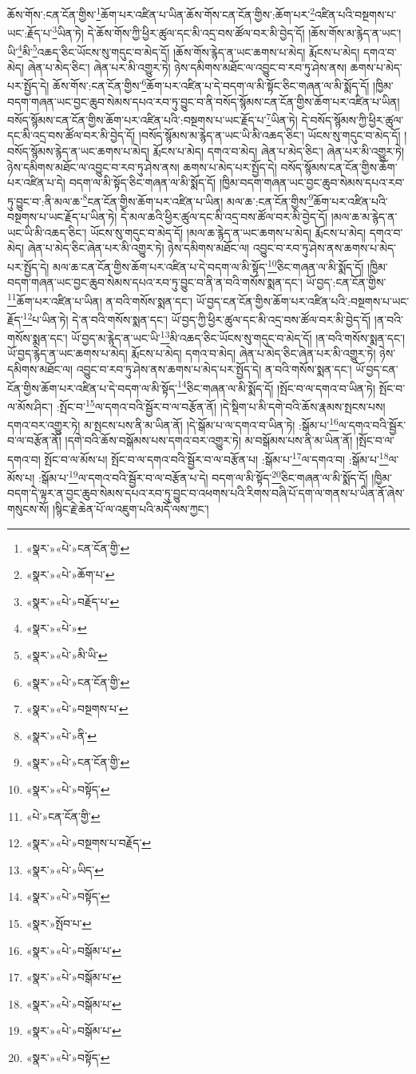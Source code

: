 ཆོས་གོས་:ངན་ངོན་གྱིས་\footnote{«སྣར་»«པེ་»ངན་ངོན་གྱི་}ཆོག་པར་འཛིན་པ་ཡིན་ཆོས་གོས་ངན་ངོན་གྱིས་:ཆོག་པར་\footnote{«སྣར་»«པེ་»ཆོག་པ་}འཛིན་པའི་བསྔགས་པ་ཡང་:རྗོད་པ་\footnote{«སྣར་»«པེ་»བརྗོད་པ་}ཡིན་ཏེ། དེ་ཆོས་གོས་ཀྱི་ཕྱིར་ཚུལ་དང་མི་འདྲ་བས་ཚོལ་བར་མི་བྱེད་དོ། །ཆོས་གོས་མ་རྙེད་ན་ཡང་། ཡི་\footnote{«སྣར་»«པེ་»}མི་\footnote{«སྣར་»«པེ་»མི་ཡི་}འཆད་ཅིང་ཡོངས་སུ་གདུང་བ་མེད་དོ། །ཆོས་གོས་རྙེད་ན་ཡང་ཆགས་པ་མེད། རྨོངས་པ་མེད། དགའ་བ་མེད། ཞེན་པ་མེད་ཅིང་། ཞེན་པར་མི་འགྱུར་ཏེ། ཉེས་དམིགས་མཐོང་ལ་འབྱུང་བ་རབ་ཏུ་ཤེས་ནས། ཆགས་པ་མེད་པར་སྤྱོད་དེ། ཆོས་གོས་:ངན་ངོན་གྱིས་\footnote{«སྣར་»«པེ་»ངན་ངོན་གྱི་}ཆོག་པར་འཛིན་པ་དེ་བདག་ལ་མི་སྟོང་ཅིང་གཞན་ལ་མི་སྨོད་དོ། །ཁྱིམ་བདག་གཞན་ཡང་བྱང་ཆུབ་སེམས་དཔའ་རབ་ཏུ་བྱུང་བ་ནི་བསོད་སྙོམས་ངན་ངོན་གྱིས་ཆོག་པར་འཛིན་པ་ཡིན། བསོད་སྙོམས་ངན་ངོན་གྱིས་ཆོག་པར་འཛིན་པའི་:བསྔགས་པ་ཡང་རྗོད་པ་\footnote{«སྣར་»«པེ་»བསྔགས་པ་}ཡིན་ཏེ། དེ་བསོད་སྙོམས་ཀྱི་ཕྱིར་ཚུལ་དང་མི་འདྲ་བས་ཚོལ་བར་མི་བྱེད་དོ། །བསོད་སྙོམས་མ་རྙེད་ན་ཡང་ཡི་མི་འཆད་ཅིང་། ཡོངས་སུ་གདུང་བ་མེད་དོ། །བསོད་སྙོམས་རྙེད་ན་ཡང་ཆགས་པ་མེད། རྨོངས་པ་མེད། དགའ་བ་མེད། ཞེན་པ་མེད་ཅིང་། ཞེན་པར་མི་འགྱུར་ཏེ། ཉེས་དམིགས་མཐོང་ལ་འབྱུང་བ་རབ་ཏུ་ཤེས་ནས། ཆགས་པ་མེད་པར་སྤྱོད་དེ། བསོད་སྙོམས་ངན་ངོན་གྱིས་ཆོག་པར་འཛིན་པ་དེ། བདག་ལ་མི་སྟོད་ཅིང་གཞན་ལ་མི་སྨོད་དོ། །ཁྱིམ་བདག་གཞན་ཡང་བྱང་ཆུབ་སེམས་དཔའ་རབ་ཏུ་བྱུང་བ་:ནི་མལ་ཆ་\footnote{«སྣར་»«པེ་»ནི་}ངན་ངོན་གྱིས་ཆོག་པར་འཛིན་པ་ཡིན། མལ་ཆ་:ངན་ངོན་གྱིས་\footnote{«སྣར་»«པེ་»ངན་ངོན་གྱི་}ཆོག་པར་འཛིན་པའི་བསྔགས་པ་ཡང་རྗོད་པ་ཡིན་ཏེ། དེ་མལ་ཆའི་ཕྱིར་ཚུལ་དང་མི་འདྲ་བས་ཚོལ་བར་མི་བྱེད་དོ། །མལ་ཆ་མ་རྙེད་ན་ཡང་ཡི་མི་འཆད་ཅིང་། ཡོངས་སུ་གདུང་བ་མེད་དོ། །མལ་ཆ་རྙེད་ན་ཡང་ཆགས་པ་མེད། རྨོངས་པ་མེད། དགའ་བ་མེད། ཞེན་པ་མེད་ཅིང་ཞེན་པར་མི་འགྱུར་ཏེ། ཉེས་དམིགས་མཐོང་ལ། འབྱུང་བ་རབ་ཏུ་ཤེས་ནས་ཆགས་པ་མེད་པར་སྤྱོད་དེ། མལ་ཆ་ངན་ངོན་གྱིས་ཆོག་པར་འཛིན་པ་དེ་བདག་ལ་མི་སྟོད་\footnote{«སྣར་»«པེ་»བསྟོད་}ཅིང་གཞན་ལ་མི་སྨོད་དོ། །ཁྱིམ་བདག་གཞན་ཡང་བྱང་ཆུབ་སེམས་དཔའ་རབ་ཏུ་བྱུང་བ་ནི་ན་བའི་གསོས་སྨན་དང་། ཡོ་བྱད་:ངན་ངོན་གྱིས་\footnote{«པེ་»ངན་ངོན་གྱི་}ཆོག་པར་འཛིན་པ་ཡིན། ན་བའི་གསོས་སྨན་དང་། ཡོ་བྱད་ངན་ངོན་གྱིས་ཆོག་པར་འཛིན་པའི་:བསྔགས་པ་ཡང་རྗོད་\footnote{«སྣར་»«པེ་»བསྔགས་པ་བརྗོད་}པ་ཡིན་ཏེ། དེ་ན་བའི་གསོས་སྨན་དང་། ཡོ་བྱད་ཀྱི་ཕྱིར་ཚུལ་དང་མི་འདྲ་བས་ཚོལ་བར་མི་བྱེད་དོ། །ན་བའི་གསོས་སྨན་དང་། ཡོ་བྱད་མ་རྙེད་ན་ཡང་ཡི་\footnote{«སྣར་»«པེ་»ཡིད་}མི་འཆད་ཅིང་ཡོངས་སུ་གདུང་བ་མེད་དོ། །ན་བའི་གསོས་སྨན་དང་། ཡོ་བྱད་རྙེད་ན་ཡང་ཆགས་པ་མེད། རྨོངས་པ་མེད། དགའ་བ་མེད། ཞེན་པ་མེད་ཅིང་ཞེན་པར་མི་འགྱུར་ཏེ། ཉེས་དམིགས་མཐོང་ལ། འབྱུང་བ་རབ་ཏུ་ཤེས་ནས་ཆགས་པ་མེད་པར་སྤྱོད་དེ། ན་བའི་གསོས་སྨན་དང་། ཡོ་བྱད་ངན་ངོན་གྱིས་ཆོག་པར་འཛིན་པ་དེ་བདག་ལ་མི་སྟོད་\footnote{«སྣར་»«པེ་»བསྟོད་}ཅིང་གཞན་ལ་མི་སྨོད་དོ། །སྤོང་བ་ལ་དགའ་བ་ཡིན་ཏེ། སྤོང་བ་ལ་མོས་ཤིང་། :སྤོང་བ་\footnote{«སྣར་»སྤོབ་པ་}ལ་དགའ་བའི་སྦྱོར་བ་ལ་བརྩོན་ནོ། །དེ་སྡིག་པ་མི་དགེ་བའི་ཆོས་རྣམས་སྤངས་པས། དགའ་བར་འགྱུར་ཏེ། མ་སྤངས་པས་ནི་མ་ཡིན་ནོ། །དེ་སྒོམ་པ་ལ་དགའ་བ་ཡིན་ཏེ། :སྒོམ་པ་\footnote{«སྣར་»«པེ་»བསྒོམ་པ་}ལ་དགའ་བའི་སྦྱོར་བ་ལ་བརྩོན་ནོ། །དགེ་བའི་ཆོས་བསྒོམས་པས་དགའ་བར་འགྱུར་ཏེ། མ་བསྒོམས་པས་ནི་མ་ཡིན་ནོ། །སྤོང་བ་ལ་དགའ་བ། སྤོང་བ་ལ་མོས་པ། སྤོང་བ་ལ་དགའ་བའི་སྦྱོར་བ་ལ་བརྩོན་པ། :སྒོམ་པ་\footnote{«སྣར་»«པེ་»བསྒོམ་པ་}ལ་དགའ་བ། :སྒོམ་པ་\footnote{«སྣར་»«པེ་»བསྒོམ་པ་}ལ་མོས་པ། :སྒོམ་པ་\footnote{«སྣར་»«པེ་»བསྒོམ་པ་}ལ་དགའ་བའི་སྦྱོར་བ་ལ་བརྩོན་པ་དེ། བདག་ལ་མི་སྟོད་\footnote{«སྣར་»«པེ་»བསྟོད་}ཅིང་གཞན་ལ་མི་སྨོད་དོ། །ཁྱིམ་བདག་དེ་ལྟར་ན་བྱང་ཆུབ་སེམས་དཔའ་རབ་ཏུ་བྱུང་བ་འཕགས་པའི་རིགས་བཞི་པོ་དག་ལ་གནས་པ་ཡིན་ནོ་ཞེས་གསུངས་སོ། །སྙིང་རྗེ་ཆེན་པོ་ལ་འཇུག་པའི་མདོ་ལས་ཀྱང་། 